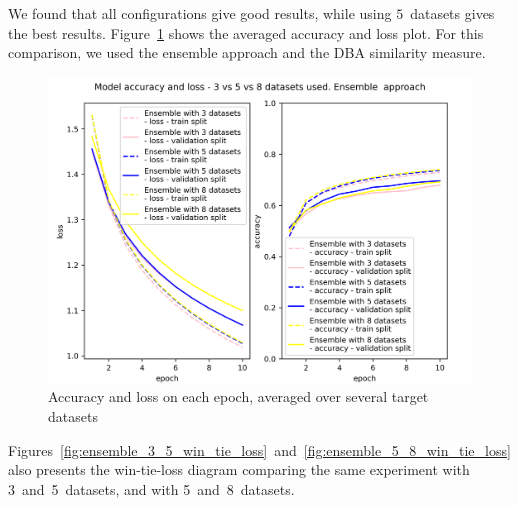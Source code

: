\documentclass[a4paper,11pt,twoside]{report}
\theoremstyle{definition}
\begin{document}
We found that all configurations give good results, while using $5$~datasets gives the best results. Figure~\ref{fig:ensemble_3_5_8} shows the averaged accuracy and loss plot. For this comparison, we used the ensemble approach and the DBA similarity measure.

\FloatBarrier
\begin{figure}[h!t]
\centering
\includegraphics[width=17cm]{imgs/ensemble_dba_3_vs_5/loss_acc.png}
\caption{Accuracy and loss on each epoch, averaged over several target datasets}
\label{fig:ensemble_3_5_8}
\end{figure}
\FloatBarrier


Figures~\ref{fig:ensemble_3_5_win_tie_loss}~and~\ref{fig:ensemble_5_8_win_tie_loss} also presents the win-tie-loss diagram comparing the same experiment with 3~and~5~datasets, and with 5~and~8~datasets.
\end{document}
